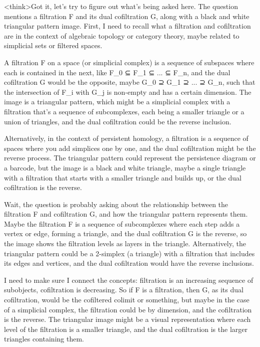 <think>Got it, let's try to figure out what's being asked here. The question mentions a filtration F and its dual cofiltration G, along with a black and white triangular pattern image. First, I need to recall what a filtration and cofiltration are in the context of algebraic topology or category theory, maybe related to simplicial sets or filtered spaces. 

A filtration F on a space (or simplicial complex) is a sequence of subspaces where each is contained in the next, like F_0 ⊆ F_1 ⊆ ... ⊆ F_n, and the dual cofiltration G would be the opposite, maybe G_0 ⊇ G_1 ⊇ ... ⊇ G_n, such that the intersection of F_i with G_j is non-empty and has a certain dimension. The image is a triangular pattern, which might be a simplicial complex with a filtration that's a sequence of subcomplexes, each being a smaller triangle or a union of triangles, and the dual cofiltration could be the reverse inclusion.

Alternatively, in the context of persistent homology, a filtration is a sequence of spaces where you add simplices one by one, and the dual cofiltration might be the reverse process. The triangular pattern could represent the persistence diagram or a barcode, but the image is a black and white triangle, maybe a single triangle with a filtration that starts with a smaller triangle and builds up, or the dual cofiltration is the reverse. 

Wait, the question is probably asking about the relationship between the filtration F and cofiltration G, and how the triangular pattern represents them. Maybe the filtration F is a sequence of subcomplexes where each step adds a vertex or edge, forming a triangle, and the dual cofiltration G is the reverse, so the image shows the filtration levels as layers in the triangle. Alternatively, the triangular pattern could be a 2-simplex (a triangle) with a filtration that includes its edges and vertices, and the dual cofiltration would have the reverse inclusions. 

I need to make sure I connect the concepts: filtration is an increasing sequence of subobjects, cofiltration is decreasing. So if F is a filtration, then G, as its dual cofiltration, would be the cofiltered colimit or something, but maybe in the case of a simplicial complex, the filtration could be by dimension, and the cofiltration is the reverse. The triangular image might be a visual representation where each level of the filtration is a smaller triangle, and the dual cofiltration is the larger triangles containing them. 

